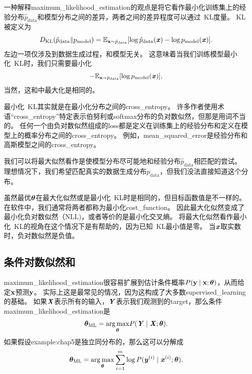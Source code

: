 一种解释\gls{maximum_likelihood_estimation}的观点是将它看作最小化训练集上的经验分布$\hat{p}_{\text{data}}$和模型分布之间的差异，两者之间的差异程度可以通过~\gls{KL}度量。
\gls{KL}被定义为
\begin{equation}
    D_{\text{KL}}(\hat{p}_{\text{data}} \| p_{\text{model}}) = \mathbb{E}_{\mathbf{x} \sim \hat{p}_{\text{data}}} [ \log \hat{p}_{\text{data}}(\boldsymbol{\mathit{x}}) - \log p_{\text{model}}(\boldsymbol{\mathit{x}}) ] .
\end{equation}
左边一项仅涉及到数据生成过程，和模型无关。
这意味着当我们训练模型最小化~\gls{KL}时，我们只需要最小化
\begin{equation}
    -\mathbb{E}_{\mathbf{x} \sim \hat{p}_{\text{data}}} [ \log p_{\text{model}}(\boldsymbol{\mathit{x}})  ] ,
\end{equation}
当然，这和中最大化是相同的。


最小化~\gls{KL}其实就是在最小化分布之间的\gls{cross_entropy}。
许多作者使用术语``\gls{cross_entropy}''特定表示伯努利或softmax分布的负对数似然，但那是用词不当的。
任何一个由负对数似然组成的\gls{loss}都是定义在训练集上的经验分布和定义在模型上的概率分布之间的\gls{cross_entropy}。
例如，\gls{mean_squared_error}是经验分布和高斯模型之间的\gls{cross_entropy}。

我们可以将最大似然看作是使模型分布尽可能地和经验分布$\hat{p}_{\text{data}}$相匹配的尝试。
理想情况下，我们希望匹配真实的数据生成分布$p_{\text{data}}$，但我们没法直接知道这个分布。

虽然最优$\boldsymbol{\theta}$在最大化似然或是最小化~\gls{KL}时是相同的，但目标函数值是不一样的。
在软件中，我们通常将两者都称为最小化\gls{cost_function}。
因此最大化似然变成了最小化负对数似然（NLL)，或者等价的是最小化交叉熵。
将最大化似然看作最小化~\gls{KL}的视角在这个情况下是有帮助的，因为已知~\gls{KL}最小值是零。
当$\boldsymbol{\mathit{x}}$取实数时，负对数似然是负值。

\subsection{条件对数似然和}
\label{sec:conditional_log_likelihood_and_mean_squared_error}
\gls{maximum_likelihood_estimation}很容易扩展到估计条件概率$P(\mathbf{y} \mid \mathbf{x};\boldsymbol{\theta})$，从而给定$\mathbf{x}$预测$\mathbf{y}$。
实际上这是最常见的情况，因为这构成了大多数\gls{supervised_learning}的基础。
如果$\boldsymbol{\mathit{X}}$表示所有的输入，$\boldsymbol{\mathit{Y}}$表示我们观测到的\gls{target}，那么条件\gls{maximum_likelihood_estimation}是
\begin{equation}
    \boldsymbol{\theta}_{\text{ML}} = \underset{\boldsymbol{\theta}}{\arg\max} P(\boldsymbol{\mathit{Y}} \mid \boldsymbol{\mathit{X}}; \boldsymbol{\theta}).
\end{equation}
如果假设\gls{example:chap5}是独立同分布的，那么这可以分解成
\begin{equation}
\label{eq:5.63}
    \boldsymbol{\theta}_{\text{ML}} = \underset{\boldsymbol{\theta}}{\arg\max} \sum_{i=1}^m \log P(\boldsymbol{\mathit{y}}^{(i)} \mid \boldsymbol{\mathit{x}}^{(i)}; \boldsymbol{\theta}).
\end{equation}

